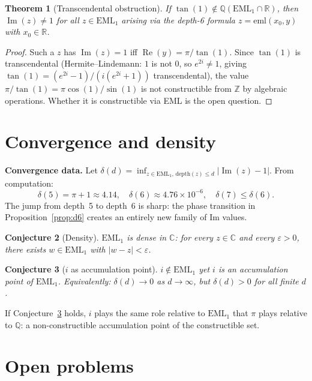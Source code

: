 \documentclass[12pt]{article}
\newtheorem{theorem}{Theorem}
\newtheorem{conjecture}[theorem]{Conjecture}
\begin{document}
\begin{theorem}[Transcendental obstruction]\label{thm:obstruction}
If $\tan(1) \notin \mathbb{Q}(\mathrm{EML}_1 \cap \mathbb{R})$, then
$\operatorname{Im}(z) \neq 1$ for all $z \in \mathrm{EML}_1$ arising via
the depth-6 formula $z = \mathrm{eml}(x_0, y)$ with $x_0 \in \mathbb{R}$.
\end{theorem}
\begin{proof}
Such a $z$ has $\operatorname{Im}(z) = 1$ iff $\operatorname{Re}(y) = \pi/\tan(1)$.
Since $\tan(1)$ is transcendental (Hermite--Lindemann: $1$ is not $0$, so $e^{2i}
\neq 1$, giving $\tan(1) = (e^{2i}-1)/(i(e^{2i}+1))$ transcendental), the value
$\pi/\tan(1) = \pi\cos(1)/\sin(1)$ is not constructible from $\mathbb{Z}$ by
algebraic operations. Whether it is constructible via EML is the open question.
\end{proof}

\section{Convergence and density}

\textbf{Convergence data.}
Let $\delta(d) = \inf_{z \in \mathrm{EML}_1,\, \mathrm{depth}(z)\leq d}
|\operatorname{Im}(z) - 1|$.
From computation:
\[
    \delta(5) = \pi + 1 \approx 4.14,
    \quad \delta(6) \approx 4.76 \times 10^{-6},
    \quad \delta(7) \leq \delta(6).
\]
The jump from depth~5 to depth~6 is sharp: the phase transition in
Proposition~\ref{prop:d6} creates an entirely new family of Im values.

\begin{conjecture}[Density]\label{conj:dense}
$\mathrm{EML}_1$ is dense in $\mathbb{C}$: for every $z \in \mathbb{C}$ and
every $\varepsilon > 0$, there exists $w \in \mathrm{EML}_1$ with $|w - z| < \varepsilon$.
\end{conjecture}

\begin{conjecture}[$i$ as accumulation point]\label{conj:accum}
$i \notin \mathrm{EML}_1$ yet $i$ is an accumulation point of $\mathrm{EML}_1$.
Equivalently: $\delta(d) \to 0$ as $d \to \infty$, but $\delta(d) > 0$ for all finite $d$.
\end{conjecture}

If Conjecture~\ref{conj:accum} holds, $i$ plays the same role relative to
$\mathrm{EML}_1$ that $\pi$ plays relative to $\mathbb{Q}$: a non-constructible
accumulation point of the constructible set.

\section{Open problems}
\end{document}
